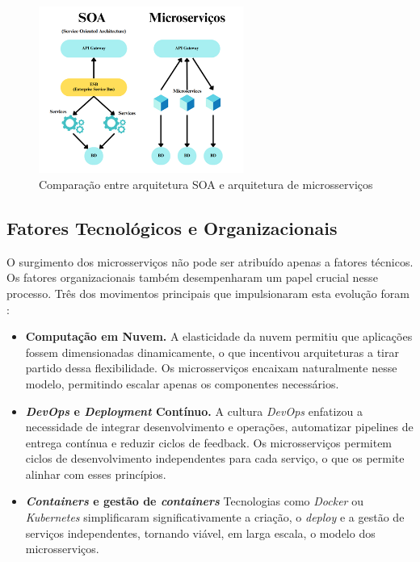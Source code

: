 \begin{figure}[h]
    \centering
    \includegraphics[width=0.6\textwidth]{images/Diagramas/soa_vs_microservicos.png}
    \caption{Comparação entre arquitetura SOA e arquitetura de microsserviços}
    \label{fig:soa_microservicos}
\end{figure}

\subsection{Fatores Tecnológicos e Organizacionais}

O surgimento dos microsserviços não pode ser atribuído apenas a fatores técnicos. Os fatores organizacionais também desempenharam um papel crucial nesse processo. Três dos movimentos principais que impulsionaram esta evolução foram \cite{Newman2015}:

\begin{itemize}
    \item \textbf{Computação em Nuvem.} A elasticidade da nuvem permitiu que aplicações fossem dimensionadas dinamicamente, o que incentivou arquiteturas a tirar partido dessa flexibilidade. Os microsserviços encaixam naturalmente nesse modelo, permitindo escalar apenas os componentes necessários.
    \item \textbf{\textit{DevOps} e \textit{Deployment} Contínuo.} A cultura \textit{DevOps} enfatizou a necessidade de integrar desenvolvimento e operações, automatizar pipelines de entrega contínua e reduzir ciclos de feedback. Os microsserviços permitem ciclos de desenvolvimento independentes para cada serviço, o que os permite alinhar com esses princípios.
    \item \textbf{\textit{Containers} e gestão de \textit{containers} } Tecnologias como \textit{Docker} ou \textit{Kubernetes} simplificaram significativamente a criação, o \textit{deploy} e a gestão de serviços independentes, tornando viável, em larga escala, o modelo dos microsserviços.
\end{itemize}

